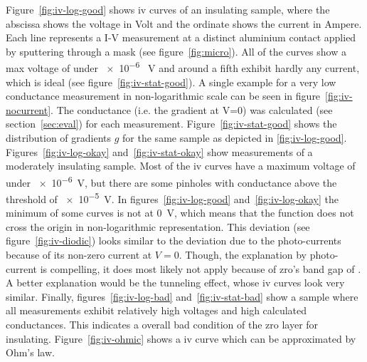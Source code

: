Figure~\ref{fig:iv-log-good} shows \gls{iv} curves of an insulating sample, where the abscissa shows the voltage in Volt and the ordinate shows the current in Ampere. 
Each line represents a I-V measurement at a distinct aluminium contact applied by sputtering through a mask (see figure~\ref{fig:micro}).
All of the curves show a max voltage of under \num{e-6} \SI{}{\volt} 
and around a fifth exhibit hardly any current, which is ideal (see figure~\ref{fig:iv-stat-good}).
A single example for a very low conductance measurement in non-logarithmic scale can be seen in figure~\ref{fig:iv-nocurrent}.
The conductance (i.e. the gradient at V=0) was calculated (see section~\ref{sec:eval}) for each measurement.
Figure~\ref{fig:iv-stat-good} shows the distribution of gradients $g$ for the same sample as depicted in \ref{fig:iv-log-good}.
%
Figures~\ref{fig:iv-log-okay} and~\ref{fig:iv-stat-okay} show measurements of a moderately insulating sample. 
Most of the \gls{iv} curves have a maximum voltage of under \num{e-6}\SI{}{\volt}, 
but there are some pinholes with conductance above the threshold of \num{e-5}\SI{}{\volt}. %
%
In figures~\ref{fig:iv-log-good} and~\ref{fig:iv-log-okay} the minimum of some curves 
is not at \SI{0}{\volt}, which means that the function does not cross the origin in non-logarithmic representation. 
%
This deviation (see figure~\ref{fig:iv-diodic}) looks similar to the deviation due to the photo-currents\cite{perez2018solar} because of its non-zero current at $V=0$.
Though, the explanation by photo-current is compelling, it does most likely not apply because of \gls{zro}'s band gap of \cite{sinhamahapatra2016oxygen}.
A better explanation would be the tunneling effect, whose \gls{iv} curves look very similar\cite{feenstra1994scanning,datta1997current}.
%
Finally, figures~\ref{fig:iv-log-bad} and~\ref{fig:iv-stat-bad} show a sample 
where all measurements exhibit relatively high voltages and high calculated conductances. 
This indicates a overall bad condition of the \gls{zro} layer for insulating. 
Figure~\ref{fig:iv-ohmic} shows a \gls{iv} curve which can be approximated by Ohm's law. 
%

